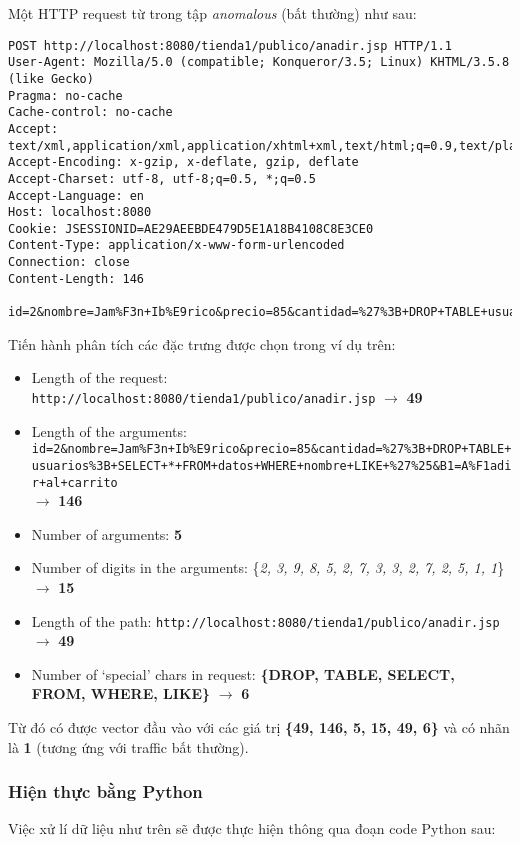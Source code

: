 \documentclass[../main-report.tex]{subfiles}
\begin{document}
\begin{example}
Một HTTP request từ trong tập \emph{anomalous} (bất thường) như sau:

\begin{lstlisting}
POST http://localhost:8080/tienda1/publico/anadir.jsp HTTP/1.1
User-Agent: Mozilla/5.0 (compatible; Konqueror/3.5; Linux) KHTML/3.5.8 (like Gecko)
Pragma: no-cache
Cache-control: no-cache
Accept: text/xml,application/xml,application/xhtml+xml,text/html;q=0.9,text/plain;q=0.8,image/png,*/*;q=0.5
Accept-Encoding: x-gzip, x-deflate, gzip, deflate
Accept-Charset: utf-8, utf-8;q=0.5, *;q=0.5
Accept-Language: en
Host: localhost:8080
Cookie: JSESSIONID=AE29AEEBDE479D5E1A18B4108C8E3CE0
Content-Type: application/x-www-form-urlencoded
Connection: close
Content-Length: 146

id=2&nombre=Jam%F3n+Ib%E9rico&precio=85&cantidad=%27%3B+DROP+TABLE+usuarios%3B+SELECT+*+FROM+datos+WHERE+nombre+LIKE+%27%25&B1=A%F1adir+al+carrito
\end{lstlisting}
\end{example} 

Tiến hành phân tích các đặc trưng được chọn trong ví dụ trên:

\begin{itemize}
\item Length of the request: \lstinline{http://localhost:8080/tienda1/publico/anadir.jsp}{} $\to$ \textbf{49}
\item Length of the arguments: \lstinline{id=2&nombre=Jam%F3n+Ib%E9rico&precio=85&cantidad=%27%3B+DROP+TABLE+usuarios%3B+SELECT+*+FROM+datos+WHERE+nombre+LIKE+%27%25&B1=A%F1adir+al+carrito}{}\\ $\to$ \textbf{146}
\item Number of arguments: \textbf{5}
\item Number of digits in the arguments: \{\emph{2, 3, 9, 8, 5, 2, 7, 3, 3, 2, 7, 2, 5, 1, 1}\} $\to$ \textbf{15}
\item Length of the path: \lstinline{http://localhost:8080/tienda1/publico/anadir.jsp} $\to$ \textbf{49}
\item Number of `special' chars in request: \textbf{\{DROP, TABLE, SELECT, FROM, WHERE, LIKE\}} $\to$ \textbf{6}
\end{itemize}

Từ đó có được vector đầu vào với các giá trị \textbf{\{49, 146, 5, 15, 49, 6\}} và có nhãn là \textbf{1} (tương ứng với traffic bất thường).

\subsubsection*{Hiện thực bằng Python}
Việc xử lí dữ liệu như trên sẽ được thực hiện thông qua đoạn code Python sau:
\end{document}
